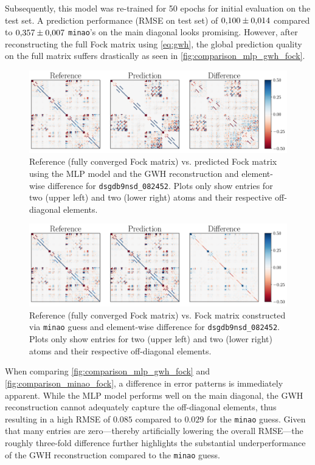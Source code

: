 Subsequently, this model was re-trained for 50 epochs for initial evaluation on the test set. A prediction performance (RMSE on test set) of $\num{0.1 \pm 0.014}$ compared to $\num{0.357 \pm 0.007}$ \texttt{minao}'s on the main diagonal looks promising. However, after reconstructing the full Fock matrix using \autoref{eq:gwh}, the global prediction quality on the full matrix suffers drastically as seen in \autoref{fig:comparison_mlp_gwh_fock}. 
\begin{figure}[H]
    \centering
    \includegraphics[width=\textwidth]{../fig/mlp_further_trials/fock_truth_vs_pred.pdf}
    \caption[MLP vs. reference Fock]{Reference (fully converged Fock matrix) vs. predicted Fock matrix using the MLP model and the GWH reconstruction and element-wise difference for \texttt{dsgdb9nsd\_082452}. Plots only show entries for two  (upper left) and two  (lower right) atoms and their respective off-diagonal elements.}
    \label{fig:comparison_mlp_gwh_fock}
\end{figure}
\begin{figure}[H]
    \centering
    \includegraphics[width=\textwidth]{../fig/mlp_further_trials/fock_truth_vs_minao.pdf}
    \caption[\texttt{minao} vs. reference Fock]{Reference (fully converged Fock matrix) vs. Fock matrix constructed via \texttt{minao} guess and element-wise difference for \texttt{dsgdb9nsd\_082452}. Plots only show entries for two  (upper left) and two  (lower right) atoms and their respective off-diagonal elements.}
    \label{fig:comparison_minao_fock}
\end{figure}
When comparing \autoref{fig:comparison_mlp_gwh_fock} and \autoref{fig:comparison_minao_fock}, a difference in error patterns is immediately apparent. While the MLP model performs well on the main diagonal, the GWH reconstruction cannot adequately capture the off-diagonal elements, thus resulting in a high RMSE of $0.085$ compared to $0.029$ for the \texttt{minao} guess. Given that many entries are zero—thereby artificially lowering the overall RMSE—the roughly three-fold difference further highlights the substantial underperformance of the GWH reconstruction compared to the \texttt{minao} guess.\\
